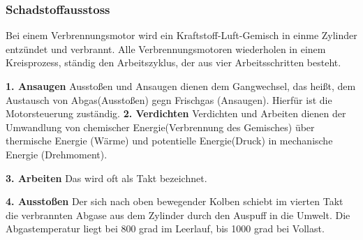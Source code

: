 \subsubsection{Schadstoffausstoss}
\label{subsec:schadstoffausstoss}

Bei einem Verbrennungsmotor wird ein Kraftstoff-Luft-Gemisch in einme Zylinder entzündet und verbrannt.
Alle Verbrennungsmotoren wiederholen in einem Kreisprozess, ständig den Arbeitszyklus, der aus vier Arbeitsschritten besteht.

\textbf{1. Ansaugen}
Ausstoßen und Ansaugen dienen dem Gangwechsel, das heißt, dem Austausch von Abgas(Ausstoßen) gegn Frischgas (Ansaugen). Hierfür ist die Motorsteuerung zuständig.
\newline
\textbf{2. Verdichten}
Verdichten und Arbeiten dienen der Umwandlung von chemischer Energie(Verbrennung des Gemisches) über thermische Energie (Wärme) und potentielle Energie(Druck) in mechanische Energie (Drehmoment).

\newline
\textbf{3. Arbeiten}
Das wird oft als Takt bezeichnet.

\newline
\textbf{4. Ausstoßen }
Der sich nach oben bewegender Kolben schiebt im vierten Takt die verbrannten Abgase aus dem Zylinder durch den Auspuff in die Umwelt. 
Die Abgastemperatur liegt bei 800 grad im Leerlauf, bis 1000 grad bei Vollast. 
\newline 


\clearpage %